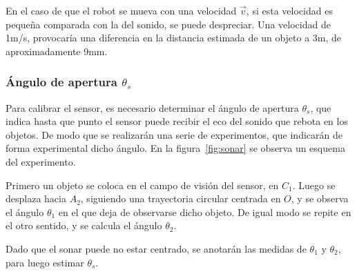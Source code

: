 \documentclass[10pt,a4paper,hidelinks,twocolumn]{article}
\begin{document}
En el caso de que el robot se mueva con una velocidad $\vec{v}$, si esta 
velocidad es pequeña comparada con la del sonido, se puede despreciar. Una 
velocidad de 1m/s, provocaría una diferencia en la distancia estimada de un 
objeto a 3m, de aproximadamente 9mm.
\subsubsection{Ángulo de apertura $\theta_{s}$}
Para calibrar el sensor, es necesario determinar el ángulo de apertura 
$\theta_{s}$, que indica hasta que punto el sensor puede recibir el eco del 
sonido que rebota en los objetos. De modo que se realizarán una serie de 
experimentos, que indicarán de forma experimental dicho ángulo. En la 
figura~\ref{fig:sonar} se observa un esquema del experimento.

Primero un objeto se coloca en el campo de visión del sensor, en $C_1$. Luego se 
desplaza hacia $A_2$, siguiendo una trayectoria circular centrada en $O$, y se 
observa el ángulo $\theta_1$ en el que deja de observarse dicho objeto. De igual 
modo se repite en el otro sentido, y se calcula el ángulo $\theta_{2}$.

Dado que el sonar puede no estar centrado, se anotarán las medidas de $\theta_1$
y $\theta_2$, para luego estimar $\theta_{s}$.
\end{document}
